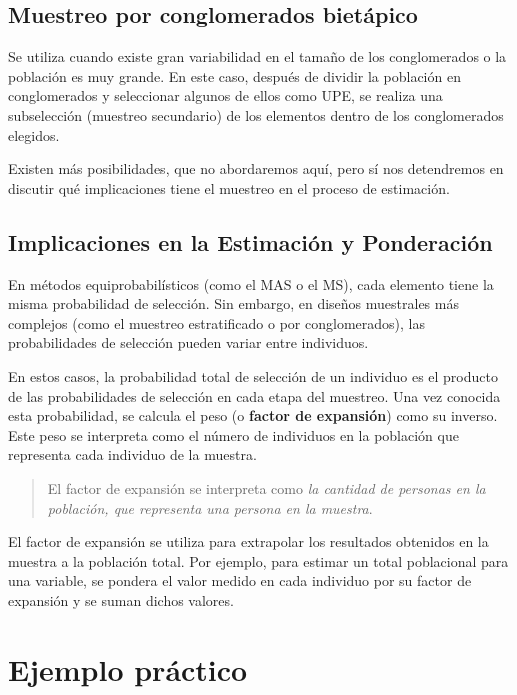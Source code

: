 \documentclass[
  spanish,
  a4paper,
]{scrbook}
\begin{document}
\subsection{Muestreo por conglomerados
bietápico}\label{muestreo-por-conglomerados-bietuxe1pico}

Se utiliza cuando existe gran variabilidad en el tamaño de los
conglomerados o la población es muy grande. En este caso, después de
dividir la población en conglomerados y seleccionar algunos de ellos
como UPE, se realiza una subselección (muestreo secundario) de los
elementos dentro de los conglomerados elegidos.

Existen más posibilidades, que no abordaremos aquí, pero sí nos
detendremos en discutir qué implicaciones tiene el muestreo en el
proceso de estimación.

\subsection{Implicaciones en la Estimación y
Ponderación}\label{implicaciones-en-la-estimaciuxf3n-y-ponderaciuxf3n}

En métodos equiprobabilísticos (como el MAS o el MS), cada elemento
tiene la misma probabilidad de selección. Sin embargo, en diseños
muestrales más complejos (como el muestreo estratificado o por
conglomerados), las probabilidades de selección pueden variar entre
individuos.

En estos casos, la probabilidad total de selección de un individuo es el
producto de las probabilidades de selección en cada etapa del muestreo.
Una vez conocida esta probabilidad, se calcula el peso (o \textbf{factor
de expansión}) como su inverso. Este peso se interpreta como el número
de individuos en la población que representa cada individuo de la
muestra.

\begin{quote}
El factor de expansión se interpreta como \emph{la cantidad de personas
en la población, que representa una persona en la muestra}.
\end{quote}

El factor de expansión se utiliza para extrapolar los resultados
obtenidos en la muestra a la población total. Por ejemplo, para estimar
un total poblacional para una variable, se pondera el valor medido en
cada individuo por su factor de expansión y se suman dichos valores.

\section{Ejemplo práctico}\label{ejemplo-pruxe1ctico}
\end{document}
